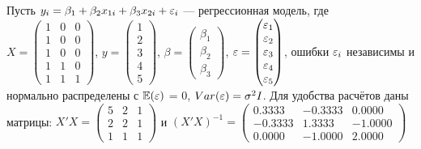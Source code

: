 \documentclass[pdftex,11pt,openany]{book}\usepackage[]{graphicx}\usepackage[]{color}
\begin{document}
\begin{solution}
\end{solution}



\begin{problem}
Пусть $y_i = \beta_1 + \beta_2 x_{1i} + \beta_3 x_{2i} + \varepsilon_i$ --- регрессионная модель, где $X = \begin{pmatrix} 1 & 0 & 0 \\ 1 & 0 & 0 \\ 1 & 0 & 0 \\ 1 & 1 & 0 \\ 1 & 1 & 1 \end{pmatrix}$, $y = \begin{pmatrix} 1 \\ 2 \\ 3 \\ 4 \\ 5 \end{pmatrix}$, $\beta = \begin{pmatrix} \beta_1 \\ \beta_2 \\ \beta_3 \end{pmatrix}$, $\varepsilon = \begin{pmatrix} \varepsilon_1 \\ \varepsilon_2 \\ \varepsilon_3 \\ \varepsilon_4 \\ \varepsilon_5  \end{pmatrix}$, ошибки $\varepsilon_i$ независимы и нормально распределены с $\mathbb{E}(\varepsilon)$ = 0, $Var(\varepsilon) = \sigma^2 I$. Для удобства расчётов даны матрицы: $X'X = \begin{pmatrix} 5 & 2 & 1 \\ 2 & 2 & 1\\ 1 & 1 & 1 \end{pmatrix}$ и $(X'X)^{-1}= \begin{pmatrix} 0.3333 & -0.3333 & 0.0000 \\ -0.3333 & 1.3333 & -1.0000 \\ 0.0000 & -1.0000 & 2.0000 \end{pmatrix}$







\end{problem}
\end{document}
